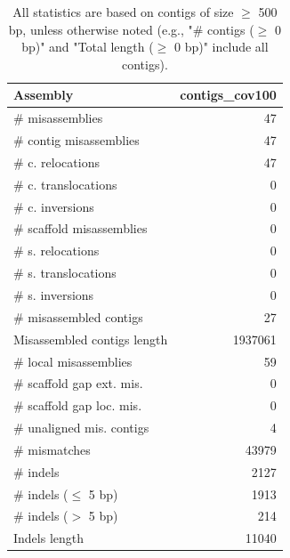 \documentclass[12pt,a4paper]{article}
\begin{document}
\begin{table}[ht]
\begin{center}
\caption{All statistics are based on contigs of size $\geq$ 500 bp, unless otherwise noted (e.g., "\# contigs ($\geq$ 0 bp)" and "Total length ($\geq$ 0 bp)" include all contigs).}
\begin{tabular}{|l*{1}{|r}|}
\hline
Assembly & contigs\_cov100 \\ \hline
\# misassemblies & 47 \\ \hline
\hspace{2mm}\# contig misassemblies & 47 \\ \hline
\hspace{5mm}\# c. relocations & 47 \\ \hline
\hspace{5mm}\# c. translocations & 0 \\ \hline
\hspace{5mm}\# c. inversions & 0 \\ \hline
\hspace{2mm}\# scaffold misassemblies & 0 \\ \hline
\hspace{5mm}\# s. relocations & 0 \\ \hline
\hspace{5mm}\# s. translocations & 0 \\ \hline
\hspace{5mm}\# s. inversions & 0 \\ \hline
\# misassembled contigs & 27 \\ \hline
Misassembled contigs length & 1937061 \\ \hline
\# local misassemblies & 59 \\ \hline
\# scaffold gap ext. mis. & 0 \\ \hline
\# scaffold gap loc. mis. & 0 \\ \hline
\# unaligned mis. contigs & 4 \\ \hline
\# mismatches & 43979 \\ \hline
\# indels & 2127 \\ \hline
\hspace{5mm}\# indels ($\leq$ 5 bp) & 1913 \\ \hline
\hspace{5mm}\# indels ($>$ 5 bp) & 214 \\ \hline
Indels length & 11040 \\ \hline
\end{tabular}
\end{center}
\end{table}
\end{document}
